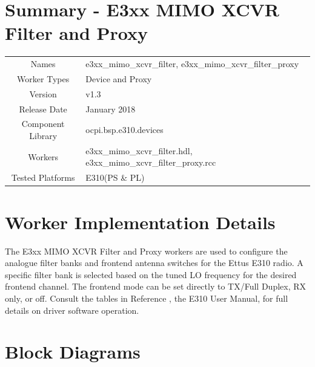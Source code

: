 \documentclass{article}
\author{} %
\date{Version \docVersion} %
\title{\docTitle}
\def\docVersion{1.3}
\def\comp{e3xx\_mimo\_xcvr\_filter}
\def\proxy{e3xx\_mimo\_xcvr\_filter\_proxy}
\def\Comp{E3xx MIMO XCVR Filter and Proxy }
\begin{document}
\section*{Summary - \Comp}
\begin{tabular}{|c|M{13.5cm}|}
	\hline
	                  &                                      \\
	\hline
	Names              & \comp, \proxy                        \\
	\hline
	Worker Types       & Device and Proxy \\
	\hline
	Version           & v\docVersion \\
	\hline
	Release Date      & January 2018 \\
	\hline
	Component Library & ocpi.bsp.e310.devices   \\
	\hline
	Workers           & \comp.hdl, \proxy.rcc                \\
	\hline
	Tested Platforms  & E310(PS \& PL)                       \\
	\hline
\end{tabular}

\section*{Worker Implementation Details}
The \Comp workers are used to configure the analogue filter banks and frontend antenna switches for the Ettus E310 radio. A specific filter bank is selected based on the tuned LO frequency for the desired frontend channel. The frontend mode can be set directly to TX/Full Duplex, RX only, or off. Consult the tables in Reference \cite{usermanual}, the E310 User Manual, for full details on driver software operation.
\section*{Block Diagrams}
\end{document}

